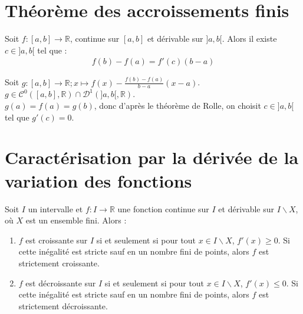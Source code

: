 \documentclass[../main.tex]{subfiles}
\begin{document}
\section{Théorème des accroissements finis}
\begin{tcolorbox}[title=Théorème 18.21, title filled=false, colframe=orange, colback=orange!10!white]
    Soit $f:[a, b]\to \mathbb{R}$, continue sur $[a, b]$ et dérivable sur $]a, b[$. Alors il existe $c\in ]a, b[$ tel que :
    \begin{align*}
        f(b) - f(a) = f'(c)(b - a)
    \end{align*}
\end{tcolorbox}

\noindent Soit $g:[a, b] \to \mathbb{R}; x \mapsto f(x) - \frac{f(b) - f(a)}{b - a}(x - a)$. \\
$g \in \mathcal{C}^0([a, b], \mathbb{R}) \cap \mathcal{D}^1(]a, b[, \mathbb{R})$. \\
$g(a) = f(a) = g(b)$, donc d'après le théorème de Rolle, on choisit $c\in ]a, b[$ tel que $g'(c) = 0$.

\section{Caractérisation par la dérivée de la variation des fonctions}
\begin{tcolorbox}[title=Théorème 18.37, title filled=false, colframe=orange, colback=orange!10!white]
    Soit $I$ un intervalle et $f:I\to \mathbb{R}$ une fonction continue sur $I$ et dérivable sur $I \backslash X$, où $X$ est un ensemble fini. Alors : 
    \begin{enumerate}
        \item $f$ est croissante sur $I$ si et seulement si pour tout $x\in I\backslash X$, $f'(x) \geq 0$. Si cette inégalité est stricte sauf en un nombre fini de points, alors $f$ est strictement croissante.
        \item $f$ est décroissante sur $I$ si et seulement si pour tout $x\in I\backslash X$, $f'(x) \leq 0$. Si cette inégalité est stricte sauf en un nombre fini de points, alors $f$ est strictement décroissante.
    \end{enumerate}
\end{tcolorbox}
\end{document}
